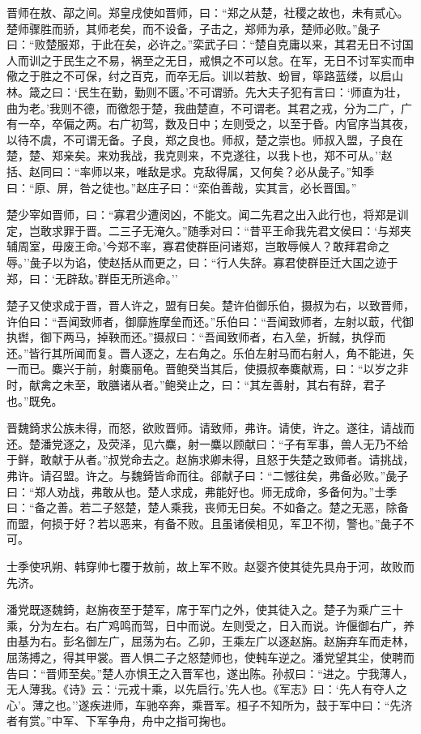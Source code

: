 \documentclass[]{article}
\begin{document}
晋师在敖、鄗之间。郑皇戌使如晋师，曰：``郑之从楚，社稷之故也，未有贰心。楚师骤胜而骄，其师老矣，而不设备，子击之，郑师为承，楚师必败。''彘子曰：``败楚服郑，于此在矣，必许之。''栾武子曰：``楚自克庸以来，其君无日不讨国人而训之于民生之不易，祸至之无日，戒惧之不可以怠。在军，无日不讨军实而申儆之于胜之不可保，纣之百克，而卒无后。训以若敖、蚡冒，筚路蓝缕，以启山林。箴之曰：`民生在勤，勤则不匮。'不可谓骄。先大夫子犯有言曰：`师直为壮，曲为老。'我则不德，而徼怨于楚，我曲楚直，不可谓老。其君之戎，分为二广，广有一卒，卒偏之两。右广初驾，数及日中；左则受之，以至于昏。内官序当其夜，以待不虞，不可谓无备。子良，郑之良也。师叔，楚之崇也。师叔入盟，子良在楚，楚、郑亲矣。来劝我战，我克则来，不克遂往，以我卜也，郑不可从。''赵括、赵同曰：``率师以来，唯敌是求。克敌得属，又何矣？必从彘子。''知季曰：``原、屏，咎之徒也。''赵庄子曰：``栾伯善哉，实其言，必长晋国。''

楚少宰如晋师，曰：``寡君少遭闵凶，不能文。闻二先君之出入此行也，将郑是训定，岂敢求罪于晋。二三子无淹久。''随季对曰：``昔平王命我先君文侯曰：`与郑夹辅周室，毋废王命。'今郑不率，寡君使群臣问诸郑，岂敢辱候人？敢拜君命之辱。''彘子以为谄，使赵括从而更之，曰：``行人失辞。寡君使群臣迁大国之迹于郑，曰：`无辟敌。'群臣无所逃命。''

楚子又使求成于晋，晋人许之，盟有日矣。楚许伯御乐伯，摄叔为右，以致晋师，许伯曰：``吾闻致师者，御靡旌摩垒而还。''乐伯曰：``吾闻致师者，左射以菆，代御执辔，御下两马，掉鞅而还。''摄叔曰：``吾闻致师者，右入垒，折馘，执俘而还。''皆行其所闻而复。晋人逐之，左右角之。乐伯左射马而右射人，角不能进，矢一而已。麋兴于前，射麋丽龟。晋鲍癸当其后，使摄叔奉麋献焉，曰：``以岁之非时，献禽之未至，敢膳诸从者。''鲍癸止之，曰：``其左善射，其右有辞，君子也。''既免。

晋魏錡求公族未得，而怒，欲败晋师。请致师，弗许。请使，许之。遂往，请战而还。楚潘党逐之，及荧泽，见六麋，射一麋以顾献曰：``子有军事，兽人无乃不给于鲜，敢献于从者。''叔党命去之。赵旃求卿未得，且怒于失楚之致师者。请挑战，弗许。请召盟。许之。与魏錡皆命而往。郤献子曰：``二憾往矣，弗备必败。''彘子曰：``郑人劝战，弗敢从也。楚人求成，弗能好也。师无成命，多备何为。''士季曰：``备之善。若二子怒楚，楚人乘我，丧师无日矣。不如备之。楚之无恶，除备而盟，何损于好？若以恶来，有备不败。且虽诸侯相见，军卫不彻，警也。''彘子不可。

士季使巩朔、韩穿帅七覆于敖前，故上军不败。赵婴齐使其徒先具舟于河，故败而先济。

潘党既逐魏錡，赵旃夜至于楚军，席于军门之外，使其徒入之。楚子为乘广三十乘，分为左右。右广鸡鸣而驾，日中而说。左则受之，日入而说。许偃御右广，养由基为右。彭名御左广，屈荡为右。乙卯，王乘左广以逐赵旃。赵旃弃车而走林，屈荡搏之，得其甲裳。晋人惧二子之怒楚师也，使軘车逆之。潘党望其尘，使聘而告曰：``晋师至矣。''楚人亦惧王之入晋军也，遂出陈。孙叔曰：``进之。宁我薄人，无人薄我。《诗》云：`元戎十乘，以先启行。'先人也。《军志》曰：`先人有夺人之心'。薄之也。''遂疾进师，车驰卒奔，乘晋军。桓子不知所为，鼓于军中曰：``先济者有赏。''中军、下军争舟，舟中之指可掬也。
\end{document}
